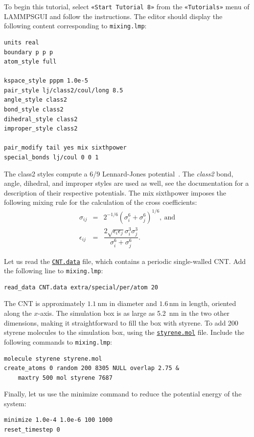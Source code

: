 \documentclass[9pt,tutorial]{livecoms}
\newcommand{\lmpcmd}[1]{\hspace{0pt}\colorbox{listing}{\textcolor{command}{\small{#1}}}\hspace{0pt}} %
\newcommand{\flecmd}[1]{\textcolor{command}{\texttt{#1}}} %
\newcommand{\guicmd}[1]{\textcolor{command}{\texttt{«#1»}}} %
\newcommand{\dwlcmd}[1]{\textcolor{download}{\texttt{#1}}} %
\newcommand{\lammpsgui}{\textsf{LAMMPS\textendash GUI}}
\newcommand{\filepath}{https://raw.githubusercontent.com/lammpstutorials/lammpstutorials-article/main/files/}
\begin{document}
To begin this tutorial, select \guicmd{Start Tutorial 8} from the
\guicmd{Tutorials} menu of \lammpsgui{} and follow the instructions.
The editor should display the following content corresponding to \flecmd{mixing.lmp}:
\begin{lstlisting}
units real
boundary p p p
atom_style full

kspace_style pppm 1.0e-5
pair_style lj/class2/coul/long 8.5
angle_style class2
bond_style class2
dihedral_style class2
improper_style class2

pair_modify tail yes mix sixthpower
special_bonds lj/coul 0 0 1
\end{lstlisting}
The \lmpcmd{class2} styles compute a 6/9 Lennard-Jones potential~\cite{sun1998compass}.
The \textit{class2} bond, angle, dihedral, and improper styles are used as
well, see the documentation for a description of their respective potentials.
The \lmpcmd{mix sixthpower} imposes the following mixing rule for the calculation
of the cross coefficients: 
\begin{eqnarray}
\nonumber
\sigma_{ij} & = & 2^{-1/6} (\sigma^6_i+\sigma_j^6)^{1/6}, ~ \text{and} \\
\nonumber
\epsilon_{ij} & = & \dfrac{2 \sqrt{\epsilon_i \epsilon_j} \sigma^3_i \sigma^3_j}{\sigma^6_i+\sigma_j^6}.
\end{eqnarray}

Let us read the \href{\filepath tutorial8/CNT.data}{\dwlcmd{CNT.data}} file, which
contains a periodic single-walled CNT.  Add the following line to \flecmd{mixing.lmp}:
\begin{lstlisting}
read_data CNT.data extra/special/per/atom 20
\end{lstlisting}
The CNT is approximately $1.1~\text{nm}$ in diameter and $1.6\,\text{nm}$ in length, oriented
along the $x$-axis. The simulation box is as large as 5.2~nm in the two other dimensions,
making it straightforward to fill the box with styrene.
To add 200 styrene molecules to the simulation box, using the
\href{\filepath tutorial8/styrene.mol}{\dwlcmd{styrene.mol}} file.
Include the following commands to \flecmd{mixing.lmp}:
\begin{lstlisting}
molecule styrene styrene.mol
create_atoms 0 random 200 8305 NULL overlap 2.75 &
    maxtry 500 mol styrene 7687
\end{lstlisting}
Finally, let us use the \lmpcmd{minimize} command to reduce the potential energy of the system:
\begin{lstlisting}
minimize 1.0e-4 1.0e-6 100 1000
reset_timestep 0
\end{lstlisting}
\end{document}
